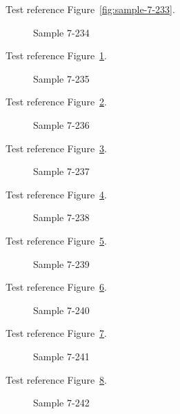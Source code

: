 Test reference Figure~\ref{fig:sample-7-233}.

\begin{figure}[tbhp]
\caption{Sample 7-234}
\label{fig:sample-7-234}
\end{figure}

Test reference Figure~\ref{fig:sample-7-234}.

\begin{figure}[tbhp]
\caption{Sample 7-235}
\label{fig:sample-7-235}
\end{figure}

Test reference Figure~\ref{fig:sample-7-235}.

\begin{figure}[tbhp]
\caption{Sample 7-236}
\label{fig:sample-7-236}
\end{figure}

Test reference Figure~\ref{fig:sample-7-236}.

\begin{figure}[tbhp]
\caption{Sample 7-237}
\label{fig:sample-7-237}
\end{figure}

Test reference Figure~\ref{fig:sample-7-237}.

\begin{figure}[tbhp]
\caption{Sample 7-238}
\label{fig:sample-7-238}
\end{figure}

Test reference Figure~\ref{fig:sample-7-238}.

\begin{figure}[tbhp]
\caption{Sample 7-239}
\label{fig:sample-7-239}
\end{figure}

Test reference Figure~\ref{fig:sample-7-239}.

\begin{figure}[tbhp]
\caption{Sample 7-240}
\label{fig:sample-7-240}
\end{figure}

Test reference Figure~\ref{fig:sample-7-240}.

\begin{figure}[tbhp]
\caption{Sample 7-241}
\label{fig:sample-7-241}
\end{figure}

Test reference Figure~\ref{fig:sample-7-241}.

\begin{figure}[tbhp]
\caption{Sample 7-242}
\label{fig:sample-7-242}
\end{figure}

